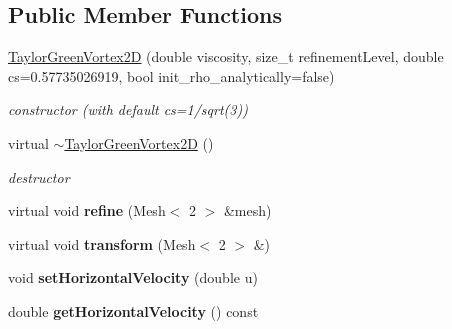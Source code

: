 \subsection*{Public Member Functions}
\begin{DoxyCompactItemize}
\item 
\hyperlink{classnatrium_1_1TaylorGreenVortex2D_a48410d029b8a0f9801b66efda45aa77f}{TaylorGreenVortex2D} (double viscosity, size\_\-t refinementLevel, double cs=0.57735026919, bool init\_\-rho\_\-analytically=false)
\begin{DoxyCompactList}\small\item\em constructor (with default cs=1/sqrt(3)) \item\end{DoxyCompactList}\item 
\hypertarget{classnatrium_1_1TaylorGreenVortex2D_abb6099f4f9791f7decabb35ccd3dbe49}{
virtual \hyperlink{classnatrium_1_1TaylorGreenVortex2D_abb6099f4f9791f7decabb35ccd3dbe49}{$\sim$TaylorGreenVortex2D} ()}
\label{classnatrium_1_1TaylorGreenVortex2D_abb6099f4f9791f7decabb35ccd3dbe49}

\begin{DoxyCompactList}\small\item\em destructor \item\end{DoxyCompactList}\item 
\hypertarget{classnatrium_1_1TaylorGreenVortex2D_af6f95264a645d97ea207b3e083b8994f}{
virtual void {\bfseries refine} (Mesh$<$ 2 $>$ \&mesh)}
\label{classnatrium_1_1TaylorGreenVortex2D_af6f95264a645d97ea207b3e083b8994f}

\item 
\hypertarget{classnatrium_1_1TaylorGreenVortex2D_a0319526156d349175c2cc7c499a81abe}{
virtual void {\bfseries transform} (Mesh$<$ 2 $>$ \&)}
\label{classnatrium_1_1TaylorGreenVortex2D_a0319526156d349175c2cc7c499a81abe}

\item 
\hypertarget{classnatrium_1_1TaylorGreenVortex2D_ad58ed418e97c541c3d9f8a1b7153bc08}{
void {\bfseries setHorizontalVelocity} (double u)}
\label{classnatrium_1_1TaylorGreenVortex2D_ad58ed418e97c541c3d9f8a1b7153bc08}

\item 
\hypertarget{classnatrium_1_1TaylorGreenVortex2D_a3f47e0968be3cd7ef9ec1cafef8124ab}{
double {\bfseries getHorizontalVelocity} () const }
\label{classnatrium_1_1TaylorGreenVortex2D_a3f47e0968be3cd7ef9ec1cafef8124ab}

\end{DoxyCompactItemize}


